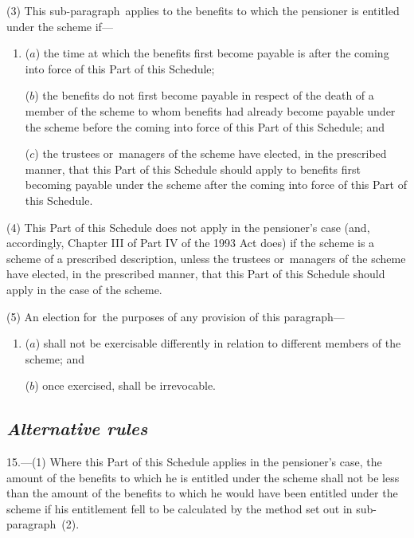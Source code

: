 \documentclass[12pt,a4paper]{article}
\begin{document}
(3) This sub-paragraph~applies to the benefits to which the pensioner is entitled under the scheme if—
\begin{enumerate}\item[]
($a$) the time at which the benefits first become payable is after the coming into force of this Part of this Schedule;

($b$) the benefits do not first become payable in respect of the death of a member of the scheme to whom benefits had already become payable under the scheme before the coming into force of this Part of this Schedule; and

($c$) the trustees or~managers of the scheme have elected, in the prescribed manner, that this Part of this Schedule should apply to benefits first becoming payable under the scheme after the coming into force of this Part of this Schedule.
\end{enumerate}

(4) This Part of this Schedule does not apply in the pensioner’s case (and, accordingly, Chapter III of Part IV of the 1993 Act does) if the scheme is a scheme of a prescribed description, unless the trustees or~managers of the scheme have elected, in the prescribed manner, that this Part of this Schedule should apply in the case of the scheme.

(5) An election for~the purposes of any provision of this paragraph—
\begin{enumerate}\item[]
($a$) shall not be exercisable differently in relation to different members of the scheme; and

($b$) once exercised, shall be irrevocable.
\end{enumerate}

\subsection*{\itshape Alternative rules}

15.---(1) Where this Part of this Schedule applies in the pensioner’s case, the amount of the benefits to which he is entitled under the scheme shall not be less than the amount of the benefits to which he would have been entitled under the scheme if his entitlement fell to be calculated by the method set out in sub-paragraph~(2).
\end{document}
